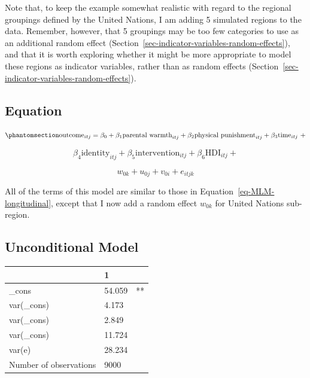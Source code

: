 \documentclass[
  letterpaper,
  DIV=11,
  numbers=noendperiod]{scrreprt}
\begin{document}
\begin{tcolorbox}[enhanced jigsaw, opacityback=0, coltitle=black, rightrule=.15mm, toprule=.15mm, bottomtitle=1mm, bottomrule=.15mm, breakable, colframe=quarto-callout-caution-color-frame, titlerule=0mm, opacitybacktitle=0.6, leftrule=.75mm, left=2mm, colback=white, toptitle=1mm, colbacktitle=quarto-callout-caution-color!10!white, title=\textcolor{quarto-callout-caution-color}{\faFire}\hspace{0.5em}{Caution}, arc=.35mm]

Note that, to keep the example somewhat realistic with regard to the
regional groupings defined by the United Nations, I am adding 5
simulated regions to the data. Remember, however, that 5 groupings may
be too few categories to use as an additional random effect
(Section~\ref{sec-indicator-variables-random-effects}), and that it is
worth exploring whether it might be more appropriate to model these
regions as indicator variables, rather than as random effects
(Section~\ref{sec-indicator-variables-random-effects}).

\end{tcolorbox}

\subsection{Equation}\label{equation}

\begin{equation}\phantomsection\label{eq-MLM-fourlevel}{\text{outcome}_{itj} = \beta_0 + \beta_1 \text{parental warmth}_{itj} + \beta_2 \text{physical punishment}_{itj} + \beta_3 \text{time}_{itj} \ + }\end{equation}

\[\beta_4 \text{identity}_{itj} + \beta_5 \text{intervention}_{itj} + \beta_6 \text{HDI}_{itj} +\]

\[w_{0k} + u_{0j} + v_{0i} + e_{itjk}\]

All of the terms of this model are similar to those in
Equation~\ref{eq-MLM-longitudinal}, except that I now add a random
effect \(w_{0k}\) for United Nations sub-region.

\subsection{Unconditional Model}\label{unconditional-model-1}

\begin{longtable}[]{@{}lll@{}}
\toprule\noalign{}
& 1 & \\
\midrule\noalign{}
\endhead
\bottomrule\noalign{}
\endlastfoot
\_cons & 54.059 & ** \\
var(\_cons) & 4.173 & \\
var(\_cons) & 2.849 & \\
var(\_cons) & 11.724 & \\
var(e) & 28.234 & \\
Number of observations & 9000 & \\
\end{longtable}
\end{document}
